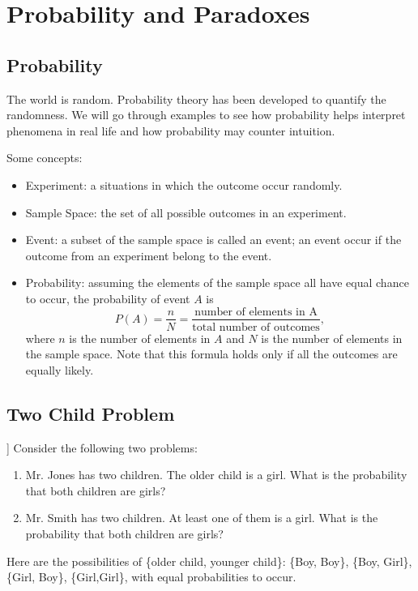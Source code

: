 \hypertarget{ch:probability}{%
\chapter{Probability and Paradoxes}\label{ch:probability}}

\hypertarget{probability}{%
\section{Probability}\label{probability}}

The world is random. Probability theory has been developed to quantify the
randomness. We will go through examples to see how probability helps
interpret phenomena in real life and how probability may counter
intuition.

Some concepts:
\begin{itemize}
\item Experiment: a situations in which the outcome occur randomly.
\item Sample Space: the set of all possible outcomes in an experiment.
\item Event: a subset of the sample space is called an event; an event
  occur if the outcome from an experiment belong to the event.
\item Probability: assuming the elements of the sample space all have
  equal chance to occur, the probability of event $A$ is\\
  \begin{equation*}
    P(A)=\frac{n}{N}
    =\frac{\text{number of elements in A}}{\text{total number of outcomes}},
  \end{equation*}
  where \(n\) is the number of elements in \(A\) and \(N\) is the
  number of elements in the sample space.  Note that this formula
  holds only if all the outcomes are equally likely.
\end{itemize}

\hypertarget{Two-Child}{%
  \section{Two Child Problem}\label{Two-Child}}

\begin{example}[[Two Child Problem]]
Consider the following two problems:
\begin{enumerate}
\item Mr. Jones has two children. The older child is a girl. What is the
  probability that both children are girls?
\item Mr. Smith has two children. At least one of them is a girl. What is the
  probability that both children are girls?
\end{enumerate}
\end{example}
Here are the possibilities of \{older child, younger child\}: \{Boy, Boy\},
\{Boy, Girl\}, \{Girl, Boy\}, \{Girl,Girl\}, with equal probabilities to occur.

